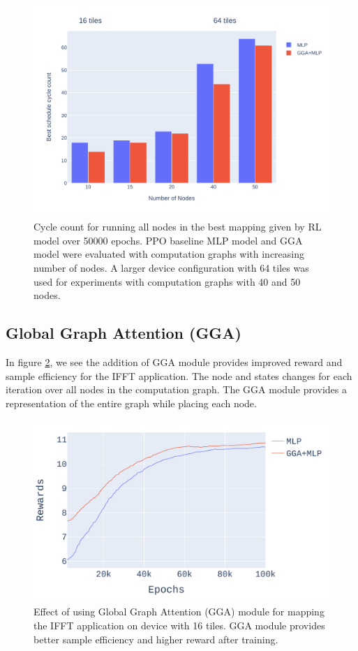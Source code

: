 \begin{figure}[h]
  \centering
  \includegraphics[width=\linewidth]{fig/nodes_graph.pdf}
  \caption{Cycle count for running all nodes in the best mapping given by RL model over 50000 epochs. 
  PPO baseline MLP model and GGA model were evaluated with computation graphs with increasing number of nodes. 
  A larger device configuration with 64 tiles was used for experiments with computation graphs with 40 and 50 nodes. }
  \label{fig:nodes_graph}
\end{figure}


\subsection{Global Graph Attention (GGA)}

In figure \ref{fig:ifft_rewards}, we see the addition of GGA module provides improved reward and sample efficiency for the IFFT application. 
The node and states changes for each iteration over all nodes in the computation graph. The GGA module provides 
a representation of the entire graph while placing each node.

\begin{figure}[h]
  \centering
  \includegraphics[width=\linewidth]{fig/plot_gnn_atten_ppo.pdf}
  \caption{Effect of using Global Graph Attention (GGA) module for mapping the IFFT application on device with 16 tiles. 
  GGA module provides better sample efficiency and higher reward after training. }
  \label{fig:ifft_rewards}
\end{figure}


